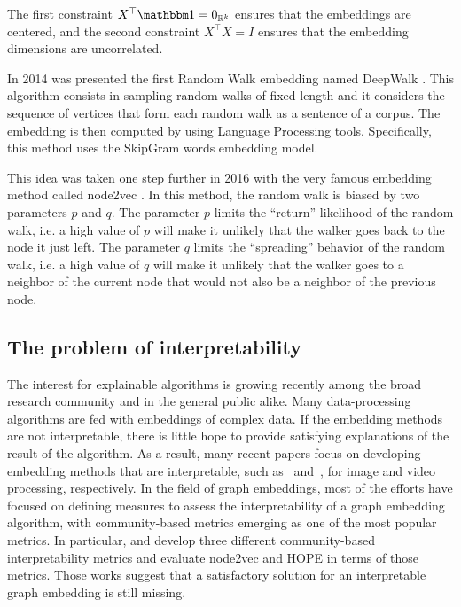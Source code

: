 The first constraint $X^\top \ones = \zeros{\realset^k}$ ensures that the embeddings are centered, and the second constraint $X^\top X = I$ ensures that the embedding dimensions are uncorrelated.

In 2014 was presented the first Random Walk embedding named DeepWalk \cite{perozzi2014_DeepWalkOnlineLearning}. This algorithm consists in sampling random walks of fixed length and it considers the sequence of vertices that form each random walk as a sentence of a corpus. The embedding is then computed by using Language Processing tools. Specifically, this method uses the SkipGram words embedding model.

This idea was taken one step further in 2016 with the very famous embedding method called node2vec \cite{groverNode2vecScalableFeature2016}. In this method, the random walk is biased by two parameters $p$ and $q$. The parameter $p$ limits the “return” likelihood of the random walk, i.e. a high value of $p$ will make it unlikely that the walker goes back to the node it just left. The parameter $q$ limits the “spreading” behavior of the random walk, i.e. a high value of $q$ will make it unlikely that the walker goes to a neighbor of the current node that would not also be a neighbor of the previous node.



\subsection{The problem of interpretability}\label{subsec:interpretability_explained}
The interest for explainable algorithms is growing recently among the broad research community and in the general public alike. Many data-processing algorithms are fed with embeddings of complex data. If the embedding methods are not interpretable, there is little hope to provide satisfying explanations of the result of the algorithm. As a result, many recent papers focus on developing embedding methods that are interpretable, such as~\cite{example_interpr_lee_2021} and~\cite{example_interpr_wu_2020}, for image and video processing, respectively.
In the field of graph embeddings, most of the efforts have focused on defining measures to assess the interpretability of a graph embedding algorithm, with community-based metrics emerging as one of the most popular metrics. In particular, \cite{khoshraftar2021} and \cite{gogoglou_2019} develop three different community-based interpretability metrics and evaluate node2vec and HOPE in terms of those metrics. Those works suggest that a satisfactory solution for an interpretable graph embedding is still missing. %


